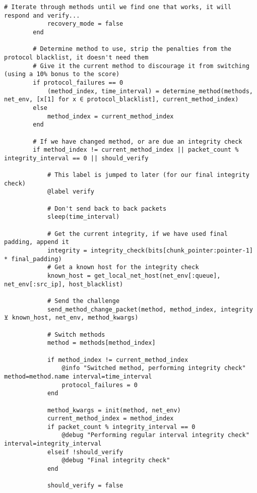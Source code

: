 \begin{lstlisting}[language=JuliaLocal, style=julia]
            # Iterate through methods until we find one that works, it will respond and verify...
            recovery_mode = false
        end

        # Determine method to use, strip the penalties from the protocol blacklist, it doesn't need them
        # Give it the current method to discourage it from switching (using a 10% bonus to the score)
        if protocol_failures == 0
            (method_index, time_interval) = determine_method(methods, net_env, [x[1] for x ∈ protocol_blacklist], current_method_index)
        else
            method_index = current_method_index
        end
        
        # If we have changed method, or are due an integrity check
        if method_index != current_method_index || packet_count % integrity_interval == 0 || should_verify

            # This label is jumped to later (for our final integrity check)
            @label verify

            # Don't send back to back packets
            sleep(time_interval)

            # Get the current integrity, if we have used final padding, append it
            integrity = integrity_check(bits[chunk_pointer:pointer-1] * final_padding)
            # Get a known host for the integrity check
            known_host = get_local_net_host(net_env[:queue], net_env[:src_ip], host_blacklist)
            
            # Send the challenge
            send_method_change_packet(method, method_index, integrity ⊻ known_host, net_env, method_kwargs)
            
            # Switch methods
            method = methods[method_index]

            if method_index != current_method_index
                @info "Switched method, performing integrity check" method=method.name interval=time_interval
                protocol_failures = 0
            end

            method_kwargs = init(method, net_env)
            current_method_index = method_index
            if packet_count % integrity_interval == 0
                @debug "Performing regular interval integrity check" interval=integrity_interval
            elseif !should_verify
                @debug "Final integrity check"
            end

            should_verify = false


\end{lstlisting}
